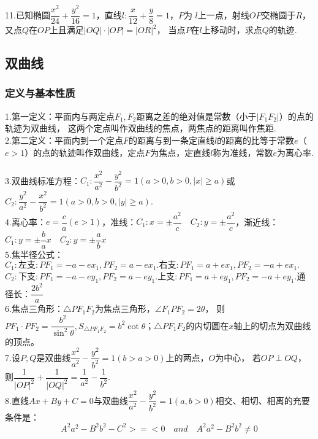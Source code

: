 11.已知椭圆$\dfrac{x^2}{24}+\dfrac{y^2}{16}=1$，直线$l:\dfrac{x}{12}+\dfrac{y}{8}=1$，$P$为
$l$上一点，射线$OP$交椭圆于$R$，又点$Q$在$OP$上且满足$|OQ|\cdot|OP|=|OR|^2$，
当点$P$在$l$上移动时，求点$Q$的轨迹.
\newpage

\subsection{双曲线}
\subsubsection{定义与基本性质}
1.第一定义：平面内与两定点$F_1,F_2$距离之差的绝对值是常数（小于$|F_1F_2|$）的点的轨迹为双曲线，
这两个定点叫作双曲线的焦点，两焦点的距离叫作焦距.
~\\

2.第二定义：平面内到一个定点$F$的距离与到一条定直线$l$的距离的比等于常数$e$（$e>1$）的点的轨迹叫作双曲线，定点$F$为焦点，定直线$l$称为准线，常数$e$为离心率.
~\\

3.双曲线标准方程：$C_1:\dfrac{x^2}{a^2}-\dfrac{y^2}{b^2}=1(a>0,b>0,|x|\geq a)$或$C_2:\dfrac{y^2}{a^2}-\dfrac{x^2}{b^2}=1(a>0,b>0,|y|\geq a)$.
~\\

4.离心率：$e=\dfrac{c}{a}(e>1)$，准线：$C_1:x=\pm \dfrac{a^2}{c}\quad C_2:y=\pm \dfrac{a^2}{c}$，渐近线：$C_1:y=\pm \dfrac{b}{a}x \quad C_2:y=\pm \dfrac{a}{b}x$
~\\

5.焦半径公式：$C_1:\text{左支}:PF_1=-a-ex_1,PF_2=a-ex_1.\text{右支}:PF_1=a+ex_1,PF_2=-a+ex_1.$
$C_2:\text{下支}:PF_1=-a-ey_1,PF_2=a-ey_1.\text{上支}:PF_1=a+ey_1,PF_2=-a+ey_1.$\quad 通径长：$\dfrac{2b^2}{a}$
~\\

6.焦点三角形：$\bigtriangleup PF_1F_2$为焦点三角形，$\angle F_1PF_2=2\theta$，
则$PF_1\cdot PF_2=\dfrac{b^2}{\sin^2{\theta}},S_{\bigtriangleup PF_1F_2}=b^2\cot{\theta}$；$\bigtriangleup PF_1F_2$的内切圆在$x$轴上的切点为双曲线的顶点。
~\\

7.设$P,Q$是双曲线$\dfrac{x^2}{a^2}-\dfrac{y^2}{b^2}=1(b>a>0)$上的两点，$O$为中心，
若$OP\perp OQ$，则$\dfrac{1}{|OP|^2}+\dfrac{1}{|OQ|^2}=\dfrac{1}{a^2}-\dfrac{1}{b^2}$.
~\\

8.直线$Ax+By+C=0$与双曲线$\dfrac{x^2}{a^2}-\dfrac{y^2}{b^2}=1(a,b>0)$相交、相切、相离的充要条件是：
\[ A^2a^2-B^2b^2-C^2>=<0 \quad and \quad A^2a^2-B^2b^2\neq 0  \]

